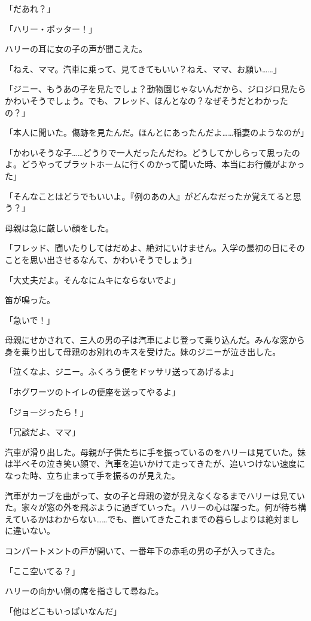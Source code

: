 \documentclass[10pt,a4paper]{article}
\begin{document}
\begin{CJK}{UTF8}{min}
「だあれ？」

「ハリー・ポッター！」

ハリーの耳に女の子の声が聞こえた。

「ねえ、ママ。汽車に乗って、見てきてもいい？ねえ、ママ、お願い……」

「ジニー、もうあの子を見たでしょ？動物園じゃないんだから、ジロジロ見たらかわいそうでしょう。でも、フレッド、ほんとなの？なぜそうだとわかったの？」

「本人に聞いた。傷跡を見たんだ。ほんとにあったんだよ……稲妻のようなのが」

「かわいそうな子……どうりで一人だったんだわ。どうしてかしらって思ったのよ。どうやってプラットホームに行くのかって聞いた時、本当にお行儀がよかった」

「そんなことはどうでもいいよ。『例のあの人』がどんなだったか覚えてると思う？」

母親は急に厳しい顔をした。

「フレッド、聞いたりしてはだめよ、絶対にいけません。入学の最初の日にそのことを思い出させるなんて、かわいそうでしょう」

「大丈夫だよ。そんなにムキにならないでよ」

笛が鳴った。

「急いで！」

母親にせかされて、三人の男の子は汽車によじ登って乗り込んだ。みんな窓から身を乗り出して母親のお別れのキスを受けた。妹のジニーが泣き出した。

「泣くなよ、ジニー。ふくろう便をドッサリ送ってあげるよ」

「ホグワーツのトイレの便座を送ってやるよ」

「ジョージったら！」

「冗談だよ、ママ」

汽車が滑り出した。母親が子供たちに手を振っているのをハリーは見ていた。妹は半べその泣き笑い顔で、汽車を追いかけて走ってきたが、追いつけない速度になった時、立ち止まって手を振るのが見えた。

汽車がカーブを曲がって、女の子と母親の姿が見えなくなるまでハリーは見ていた。家々が窓の外を飛ぶように過ぎていった。ハリーの心は躍った。何が待ち構えているかはわからない……でも、置いてきたこれまでの暮らしよりは絶対ましに違いない。

コンパートメントの戸が開いて、一番年下の赤毛の男の子が入ってきた。

「ここ空いてる？」

ハリーの向かい側の席を指さして尋ねた。

「他はどこもいっぱいなんだ」


\end{CJK}
\end{document}
